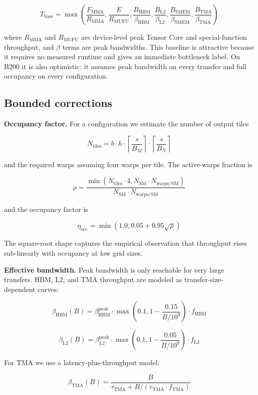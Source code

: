 \documentclass[
  11pt,
]{article}
\begin{document}
\[
T_{\text{base}} = \max\left(
\frac{F_{\text{MMA}}}{R_{\text{MMA}}},
\frac{E}{R_{\text{MUFU}}},
\frac{B_{\text{HBM}}}{\beta_{\text{HBM}}},
\frac{B_{\text{L2}}}{\beta_{\text{L2}}},
\frac{B_{\text{SMEM}}}{\beta_{\text{SMEM}}},
\frac{B_{\text{TMA}}}{\beta_{\text{TMA}}}
\right)
\]

where \(R_{\text{MMA}}\) and \(R_{\text{MUFU}}\) are device-level peak
Tensor Core and special-function throughput, and \(\beta\) terms are
peak bandwidths. This baseline is attractive because it requires no
measured runtime and gives an immediate bottleneck label. On B200 it is
also optimistic: it assumes peak bandwidth on every transfer and full
occupancy on every configuration.

\subsection{Bounded corrections}\label{bounded-corrections}

\textbf{Occupancy factor.} For a configuration we estimate the number of
output tiles

\[
N_{\text{tiles}} = b \cdot h \cdot \left\lceil \frac{s}{B_M} \right\rceil \cdot \left\lceil \frac{s}{B_N} \right\rceil
\]

and the required warps assuming four warps per tile. The active-warps
fraction is

\[
\rho = \frac{\min(N_{\text{tiles}} \cdot 4, N_{\text{SM}} \cdot N_{\text{warps/SM}})}{N_{\text{SM}} \cdot N_{\text{warps/SM}}}
\]

and the occupancy factor is

\[
\eta_{\text{occ}} = \min\left(1.0, 0.05 + 0.95 \sqrt{\rho}\right)
\]

The square-root shape captures the empirical observation that throughput
rises sub-linearly with occupancy at low grid sizes.

\textbf{Effective bandwidth.} Peak bandwidth is only reachable for very
large transfers. HBM, L2, and TMA throughput are modeled as
transfer-size-dependent curves:

\[
\beta_{\text{HBM}}(B) = \beta_{\text{HBM}}^{\text{peak}} \cdot \max(0.1, 1 - \frac{0.15}{B / 10^9}) \cdot f_{\text{HBM}}
\]

\[
\beta_{\text{L2}}(B) = \beta_{\text{L2}}^{\text{peak}} \cdot \max(0.1, 1 - \frac{0.05}{B / 10^9}) \cdot f_{\text{L2}}
\]

For TMA we use a latency-plus-throughput model:

\[
\beta_{\text{TMA}}(B) = \frac{B}{\tau_{\text{TMA}} + B / (r_{\text{TMA}} \cdot f_{\text{TMA}})}
\]
\end{document}
